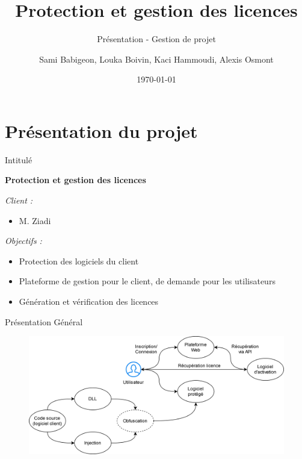 \documentclass{cubeamer}
\title{Protection et gestion des licences}
\subtitle{Présentation - Gestion de projet}
\author{Sami Babigeon, Louka Boivin, Kaci Hammoudi, Alexis Osmont}
\date{\today}
\institute[Université de Rouen]{Master Informatique - 1ère année}
\begin{document}
\maketitle
\cutoc

%
%



\section{Présentation du projet}

\begin{frame}{Intitulé}
    \centerline{\textbf{Protection et gestion des licences}}
    \medskip
    \emph{Client :}
    \begin{itemize}
        \item M. Ziadi
    \end{itemize}
    \emph{Objectifs :}
    \begin{itemize}
        \item Protection des logiciels du client
        \item Plateforme de gestion pour le client, de demande pour les utilisateurs
        \item Génération et vérification des licences
    \end{itemize}
\end{frame}

\begin{frame}{Présentation Général}
    \begin{figure}
        \includegraphics[scale=0.7]{img/general.png}
    \end{figure}
\end{frame}
\end{document}
